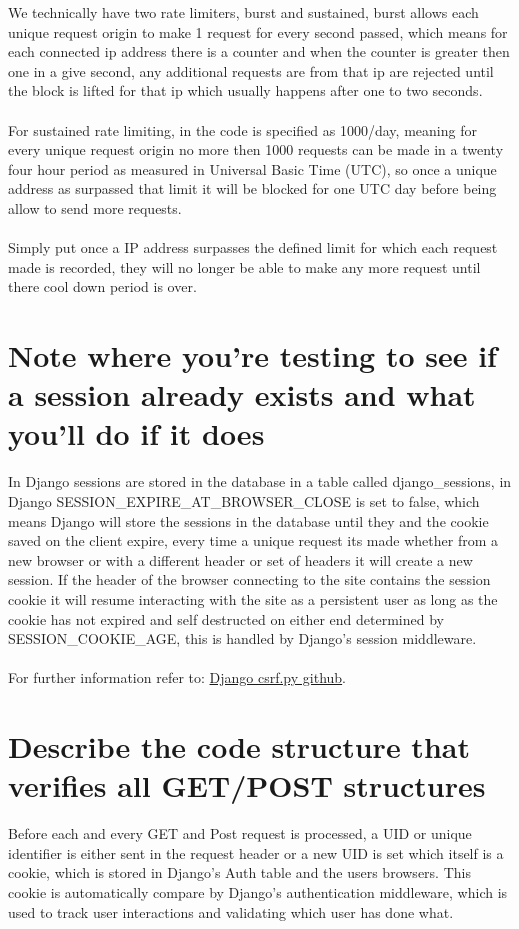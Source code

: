 \documentclass{article}
\begin{document}
    We technically have two rate limiters, burst and sustained, burst allows each unique request origin to make 1 request for every second passed, which means for each connected ip address there is a counter and when the counter is greater then one in a give second, any additional requests are from that ip are rejected until the block is lifted for that ip which usually happens after one to two seconds.
    \\
    \\
    For sustained rate limiting, in the code is specified as 1000/day, meaning for every unique request origin no more then 1000 requests can be made in a twenty four hour period as measured in Universal Basic Time (UTC), so once a unique address as surpassed that limit it will be blocked for one UTC day before being allow to send more requests.
    \\
    \\
    Simply put once a IP address surpasses the defined limit for which each request made is recorded, they will no longer be able to make any more request until there cool down period is over.  
    
    \section{Note where you're testing to see if a session already exists and what you'll do if it does}
    
    In Django sessions are stored in the database in a table called  django\_sessions, in Django SESSION\_EXPIRE\_AT\_BROWSER\_CLOSE is set to false, which means Django will store the sessions in the database until they and the cookie saved on the client expire, every time a unique request its made whether from a new browser or with a different header or set of headers it will create a new session. If the header of the browser connecting to the site contains the session cookie it will resume interacting with the site as a persistent user as long as the cookie has not expired and self destructed on either end determined by SESSION\_COOKIE\_AGE, this is handled by Django's session middleware.
    \\
    \\
    For further information refer to: \href{https://github.com/django/django/blob/main/django/middleware/csrf.py}{Django csrf.py github}.
    
    \section{Describe the code structure that verifies all GET/POST structures}
    Before each and every GET and Post request is processed, a UID or unique identifier is either sent in the request header or a new UID is set which itself is a cookie, which is stored in Django's Auth table and the users browsers. This cookie is automatically compare by Django's authentication middleware, which is used to track user interactions and validating which user has done what.
    
\end{document}
